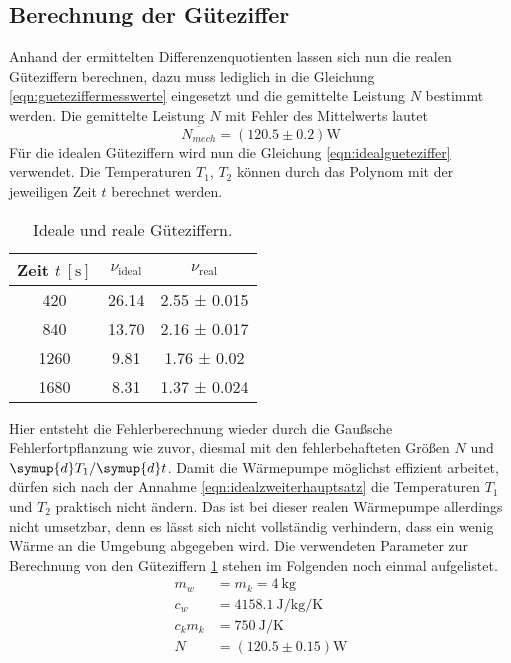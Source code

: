 \subsection{Berechnung der Güteziffer}
Anhand der ermittelten Differenzenquotienten lassen sich nun die realen Güteziffern berechnen, dazu muss lediglich in die Gleichung \eqref{eqn:gueteziffermesswerte} eingesetzt und die
gemittelte Leistung $N$ bestimmt werden.
Die gemittelte Leistung $N$ mit Fehler des Mittelwerts lautet
\begin{equation}
\overline{N_{mech}} = (120.5 \pm 0.2) \text{W}
\end{equation}
Für die idealen Güteziffern wird nun die Gleichung \eqref{eqn:idealgueteziffer} verwendet. Die Temperaturen $T_{1}$, $T_{2}$ können durch das Polynom mit der jeweiligen Zeit $t$ berechnet werden.
\begin{table}
  \centering
  \caption{Ideale und reale Güteziffern.}
  \label{tab:gueteziffernidealundreal}
  \begin{tabular}{c c c}
    \toprule
    Zeit {$t \: [\si{\second}]$} & {$\nu_\text{ideal}$} & {$\nu_\text{real}$} \\
    \midrule
    420  & 26.14 & 2.55 ± 0.015 \\
    840  & 13.70 & 2.16 ± 0.017 \\
    1260  &  9.81 & 1.76 ± 0.02 \\
    1680 &  8.31 & 1.37 ± 0.024\\
    \bottomrule
  \end{tabular}
\end{table}
Hier entsteht die Fehlerberechnung wieder durch die Gaußsche Fehlerfortpflanzung wie zuvor, diesmal mit den fehlerbehafteten Größen $N$ und ${\symup{d}T_{1}}/{\symup{d}t}$.
Damit die Wärmepumpe möglichst effizient arbeitet, dürfen sich nach der Annahme \eqref{eqn:idealzweiterhauptsatz} die Temperaturen $T_{1}$ und $T_{2}$ praktisch nicht ändern.
Das ist bei dieser realen Wärmepumpe allerdings nicht umsetzbar, denn es lässt sich nicht vollständig verhindern, dass ein wenig Wärme an die Umgebung abgegeben wird.
Die verwendeten Parameter zur Berechnung von den Güteziffern \ref{tab:gueteziffernidealundreal} stehen im Folgenden noch einmal aufgelistet.
\begin{align}
m_{w} &= m_{k} = \SI{4}{\kilo\gram} \\
c_{w} &= \SI{4158.1}{\joule\per\kilo\gram\per\kelvin}\\
c_{k}m_{k} &= \SI{750}{\joule\per\kelvin}\\
N &= (120.5 \pm 0.15) \text{W}
\end{align}
